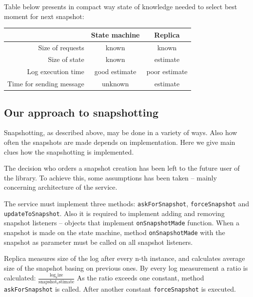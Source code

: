 Table below presents in compact way state of knowledge needed to select best moment for next snapshot:
\begin{center}
\small
\begin{tabular}{r|c|c|}
\cline{2-3}
 & State machine & Replica \\ \hline 
\multicolumn{1}{|r|}{Size of requests} & known & known \\ \hline
\multicolumn{1}{|r|}{Size of state } & known & estimate \\ \hline
\multicolumn{1}{|r|}{Log execution time} & good estimate & poor estimate \\ \hline
\multicolumn{1}{|r|}{Time for sending message} & unknown & estimate \\ \hline
\end{tabular}
\end{center}

\subsection{Our approach to snapshotting}
\label{subsec:our_approach_to_snapshotting}
Snapshotting, as described above, may be done in a variety of ways. Also how often the snapshots are made depends on implementation. Here we give main clues how the snapshotting is implemented.

The decision who orders a snapshot creation has been left to the future user of the library. To achieve this, some assumptions has been taken -- mainly
concerning architecture of the service.

The service must implement three methods: \texttt{askForSnapshot}, \texttt{forceSnapshot} and \texttt{up\-date\-To\-Snap\-shot}. Also it is required to implement adding and removing snapshot listeners -- objects that implement \texttt{onSnapshotMade} function. When a snapshot is made on the state machine, method \texttt{onSnapshotMade} with the snapshot as parameter must be called on all snapshot listeners.

Replica measures size of the log after every n-th instance, and calculates average size of the snapshot basing on previous ones. By every log measurement a ratio is calculated: $\frac{ \mathrm{log_size} }{ \mathrm{snapshot_estimate} }$ As the ratio exceeds one constant, method \texttt{askForSnapshot} is called. After another constant \texttt{forceSnapshot} is executed.

